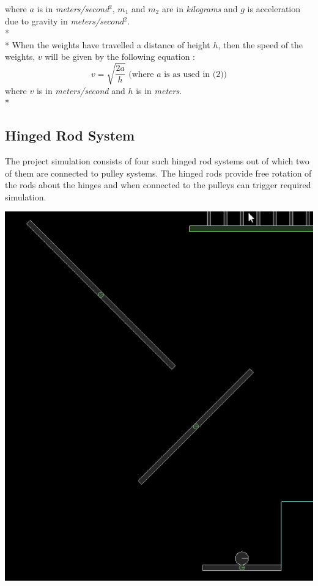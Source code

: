 \documentclass[11pt]{article}
\begin{document}
where $a$ is in \emph{meters/second$^2$}, $m_1$ and $m_2$ are in \emph{kilograms} and $g$ is acceleration due to gravity in \emph{meters/second$^2$}.\\*\\*
When the weights have travelled a distance of height $h$, then the speed of the weights, $v$ will be given by the following equation :
\begin{equation}
                                                 v = \sqrt{\frac{2a}{h}} \mbox{ (where $a$ is as used in (2))}
\end{equation}
where $v$ is in \emph{meters/second} and $h$ is in \emph{meters}.
\\*
\subsection{Hinged Rod System}
The project simulation consists of four such hinged rod systems out of which two of them are connected to pulley systems. The hinged rods provide free rotation of the rods about the hinges and when connected to the pulleys can trigger required simulation.
\begin{center}
\includegraphics[scale=0.5]{hinge}
\end{center}
\end{document}
